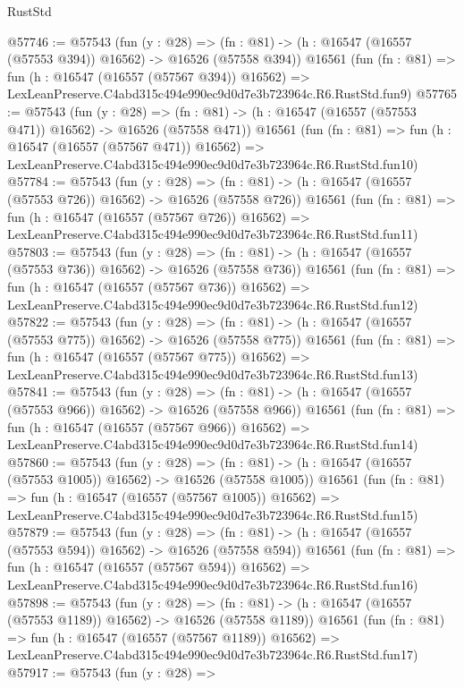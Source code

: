\begin{lexlean}{RustStd}
\begin{coremodule}
@57746 := @57543
    (fun (y : @28) =>
    (fn : @81) -> (h : @16547 (@16557 (@57553 @394)) @16562) -> @16526 (@57558 @394))
    @16561
    (fun (fn : @81) =>
    fun (h : @16547 (@16557 (@57567 @394)) @16562) =>
    LexLeanPreserve.C4abd315c494e990ec9d0d7e3b723964c.R6.RustStd.fun9)
@57765 := @57543
    (fun (y : @28) =>
    (fn : @81) -> (h : @16547 (@16557 (@57553 @471)) @16562) -> @16526 (@57558 @471))
    @16561
    (fun (fn : @81) =>
    fun (h : @16547 (@16557 (@57567 @471)) @16562) =>
    LexLeanPreserve.C4abd315c494e990ec9d0d7e3b723964c.R6.RustStd.fun10)
@57784 := @57543
    (fun (y : @28) =>
    (fn : @81) -> (h : @16547 (@16557 (@57553 @726)) @16562) -> @16526 (@57558 @726))
    @16561
    (fun (fn : @81) =>
    fun (h : @16547 (@16557 (@57567 @726)) @16562) =>
    LexLeanPreserve.C4abd315c494e990ec9d0d7e3b723964c.R6.RustStd.fun11)
@57803 := @57543
    (fun (y : @28) =>
    (fn : @81) -> (h : @16547 (@16557 (@57553 @736)) @16562) -> @16526 (@57558 @736))
    @16561
    (fun (fn : @81) =>
    fun (h : @16547 (@16557 (@57567 @736)) @16562) =>
    LexLeanPreserve.C4abd315c494e990ec9d0d7e3b723964c.R6.RustStd.fun12)
@57822 := @57543
    (fun (y : @28) =>
    (fn : @81) -> (h : @16547 (@16557 (@57553 @775)) @16562) -> @16526 (@57558 @775))
    @16561
    (fun (fn : @81) =>
    fun (h : @16547 (@16557 (@57567 @775)) @16562) =>
    LexLeanPreserve.C4abd315c494e990ec9d0d7e3b723964c.R6.RustStd.fun13)
@57841 := @57543
    (fun (y : @28) =>
    (fn : @81) -> (h : @16547 (@16557 (@57553 @966)) @16562) -> @16526 (@57558 @966))
    @16561
    (fun (fn : @81) =>
    fun (h : @16547 (@16557 (@57567 @966)) @16562) =>
    LexLeanPreserve.C4abd315c494e990ec9d0d7e3b723964c.R6.RustStd.fun14)
@57860 := @57543
    (fun (y : @28) =>
    (fn : @81) -> (h : @16547 (@16557 (@57553 @1005)) @16562) -> @16526 (@57558 @1005))
    @16561
    (fun (fn : @81) =>
    fun (h : @16547 (@16557 (@57567 @1005)) @16562) =>
    LexLeanPreserve.C4abd315c494e990ec9d0d7e3b723964c.R6.RustStd.fun15)
@57879 := @57543
    (fun (y : @28) =>
    (fn : @81) -> (h : @16547 (@16557 (@57553 @594)) @16562) -> @16526 (@57558 @594))
    @16561
    (fun (fn : @81) =>
    fun (h : @16547 (@16557 (@57567 @594)) @16562) =>
    LexLeanPreserve.C4abd315c494e990ec9d0d7e3b723964c.R6.RustStd.fun16)
@57898 := @57543
    (fun (y : @28) =>
    (fn : @81) -> (h : @16547 (@16557 (@57553 @1189)) @16562) -> @16526 (@57558 @1189))
    @16561
    (fun (fn : @81) =>
    fun (h : @16547 (@16557 (@57567 @1189)) @16562) =>
    LexLeanPreserve.C4abd315c494e990ec9d0d7e3b723964c.R6.RustStd.fun17)
@57917 := @57543
    (fun (y : @28) =>

\end{coremodule}
\end{lexlean}
